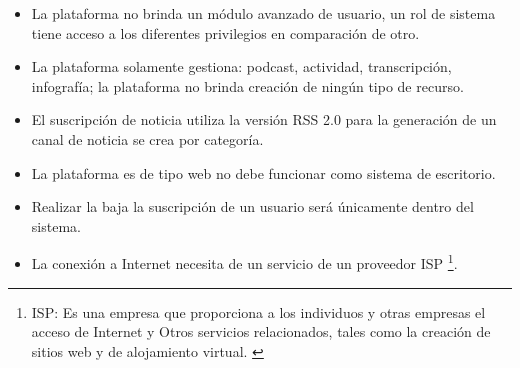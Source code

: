 \begin{itemize}

\item La plataforma no brinda un módulo avanzado de usuario, un rol de sistema
tiene acceso a los diferentes privilegios en comparación de otro.

\item La plataforma solamente gestiona: podcast, actividad, transcripción,
infografía; la plataforma no brinda creación de ningún tipo de recurso.

\item El suscripción de noticia utiliza la versión RSS 2.0 para la generación
de un canal de noticia se crea por categoría.

\item La plataforma es de tipo web no debe funcionar como sistema
de escritorio.

\item Realizar la baja la suscripción de un usuario será únicamente dentro
del sistema.

\item La conexión a Internet necesita de un servicio de un proveedor ISP
\footnote{ISP: Es una empresa que proporciona a los individuos y otras empresas
el acceso de Internet y Otros servicios relacionados, tales como la creación
de sitios web y de alojamiento virtual. \cite{isp}}. 

\end{itemize}